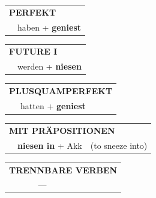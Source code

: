 \documentclass[10pt,a4paper]{revtex4-2}
\begin{document}
\begin{verbbox}
\vspace{10pt}

\begin{tabular}{rl}
\multicolumn{2}{l}{\textbf{PERFEKT}}\\
& haben + \textbf{geniest}\\
\end{tabular}
\hfill
\begin{tabular}{rl}
\multicolumn{2}{l}{\textbf{FUTURE I}}\\
& werden + \textbf{niesen}\\
\end{tabular}
\hfill
\begin{tabular}{rl}
\multicolumn{2}{l}{\textbf{PLUSQUAMPERFEKT}}\\
& hatten + \textbf{geniest}\\
\end{tabular}

\vspace{10pt}

\begin{tabular}{lll}
\multicolumn{3}{l}{\textbf{MIT PRÄPOSITIONEN}}\\
& \textbf{niesen in} + Akk & (to sneeze into)\\
\end{tabular}
\hfill
\begin{tabular}{lll}
\multicolumn{3}{l}{\textbf{TRENNBARE VERBEN}}\\
& ---\\
\end{tabular}
\vspace{-5pt}
\end{verbbox}
\end{document}
